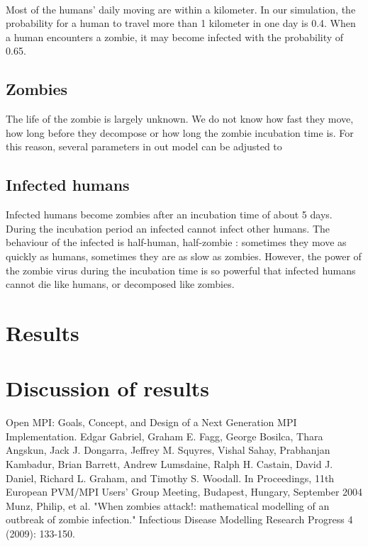 \documentclass{report}
\begin{document}
\paragraph{}
Most of the humans' daily moving are within a kilometer. In our simulation, the probability for a human to travel more than 1 kilometer in one day is 0.4. When a human encounters a zombie, it may become infected with the probability of 0.65.

\subsection{Zombies}
The life of the zombie is largely unknown. We do not know how fast they move, how long before they decompose or how long the zombie incubation time is. For this reason, several parameters in out model can be adjusted to 

\subsection{Infected humans}
Infected humans become zombies after an incubation time of about 5 days. During the incubation period an infected cannot infect other humans. The behaviour of the infected is half-human, half-zombie : sometimes they move as quickly as humans, sometimes they are as slow as zombies. However, the power of the zombie virus during the incubation time is so powerful that infected humans cannot die like humans, or decomposed like zombies.




\section{Results}




\section{Discussion of results}

\begin{thebibliography}{99}
Open MPI: Goals, Concept, and Design of a Next Generation MPI Implementation. Edgar Gabriel, Graham E. Fagg, George Bosilca, Thara Angskun, Jack J. Dongarra, Jeffrey M. Squyres, Vishal Sahay, Prabhanjan Kambadur, Brian Barrett, Andrew Lumsdaine, Ralph H. Castain, David J. Daniel, Richard L. Graham, and Timothy S. Woodall. In Proceedings, 11th European PVM/MPI Users' Group Meeting, Budapest, Hungary, September 2004
Munz, Philip, et al. "When zombies attack!: mathematical modelling of an outbreak of zombie infection." Infectious Disease Modelling Research Progress 4 (2009): 133-150.
\end{thebibliography}
\end{document}
